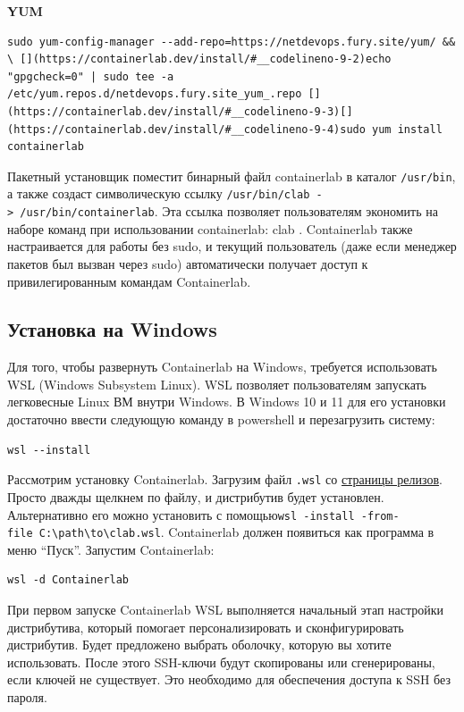 \documentclass[
  english,
  russian,
  12pt,
  a4paper,
]{phdthesr}
\begin{document}
\textbf{YUM}

\begin{verbatim}
sudo yum-config-manager --add-repo=https://netdevops.fury.site/yum/ && \ [](https://containerlab.dev/install/#__codelineno-9-2)echo "gpgcheck=0" | sudo tee -a /etc/yum.repos.d/netdevops.fury.site_yum_.repo [](https://containerlab.dev/install/#__codelineno-9-3)[](https://containerlab.dev/install/#__codelineno-9-4)sudo yum install containerlab
\end{verbatim}

Пакетный установщик поместит бинарный файл containerlab в каталог
\texttt{/usr/bin}, а также создаст символическую ссылку
\texttt{/usr/bin/clab\ -\textgreater{}\ /usr/bin/containerlab}. Эта
ссылка позволяет пользователям экономить на наборе команд при
использовании containerlab: clab . Containerlab также настраивается для
работы без sudo, и текущий пользователь (даже если менеджер пакетов был
вызван через sudo) автоматически получает доступ к привилегированным
командам Containerlab.

\subsection{Установка на
Windows}\label{ux443ux441ux442ux430ux43dux43eux432ux43aux430-ux43dux430-windows-1}

Для того, чтобы развернуть Containerlab на Windows, требуется
использовать WSL (Windows Subsystem Linux). WSL позволяет пользователям
запускать легковесные Linux ВМ внутри Windows. В Windows 10 и 11 для его
установки достаточно ввести следующую команду в powershell и
перезагрузить систему:

\begin{verbatim}
wsl --install
\end{verbatim}

Рассмотрим установку Containerlab. Загрузим файл \texttt{.wsl} со
\href{https://github.com/srl-labs/wsl-containerlab/releases/tag/0.69.3-1.0}{страницы
релизов}. Просто дважды щелкнем по файлу, и дистрибутив будет
установлен. Альтернативно его можно установить с
помощью\texttt{wsl\ -install\ -from-file\ C:\textbackslash{}path\textbackslash{}to\textbackslash{}clab.wsl}.
Containerlab должен появиться как программа в меню \enquote{Пуск}.
Запустим Containerlab:

\begin{verbatim}
wsl -d Containerlab
\end{verbatim}

При первом запуске Containerlab WSL выполняется начальный этап настройки
дистрибутива, который помогает персонализировать и сконфигурировать
дистрибутив. Будет предложено выбрать оболочку, которую вы хотите
использовать. После этого SSH-ключи будут скопированы или сгенерированы,
если ключей не существует. Это необходимо для обеспечения доступа к SSH
без пароля.
\end{document}
